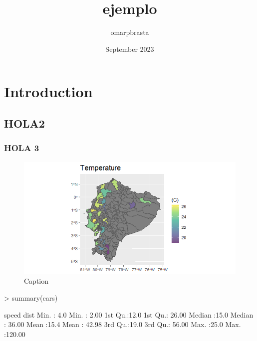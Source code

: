 \documentclass{article}
\begin{document}


\title{ejemplo}
\author{omarpbrasta }
\date{September 2023}

\maketitle

\section{Introduction}
\subsection{HOLA2}
\subsubsection{HOLA 3}

\begin{figure}[h]
    \centering
    \includegraphics{Rplot.png}
    \caption{Caption}
    \label{fig:enter-label}
\end{figure}


\begin{Schunk}
\begin{Sinput}
> summary(cars)
\end{Sinput}
\begin{Soutput}
     speed           dist       
 Min.   : 4.0   Min.   :  2.00  
 1st Qu.:12.0   1st Qu.: 26.00  
 Median :15.0   Median : 36.00  
 Mean   :15.4   Mean   : 42.98  
 3rd Qu.:19.0   3rd Qu.: 56.00  
 Max.   :25.0   Max.   :120.00  
\end{Soutput}
\end{Schunk}
\end{document}
